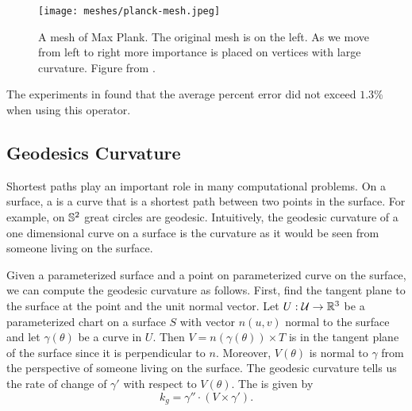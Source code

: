 \begin{figure}[htb]
\centering
\texttt{[image: meshes/planck-mesh.jpeg]}
\caption{A mesh of Max Plank. The original mesh is on the left. As we move
from left to right more importance is placed on vertices with large curvature.
Figure from \cite{alliez-2002}.}
\label{fig:planck-mesh}
\end{figure}


The experiments in \cite{mmsb-2003} found that the average
percent error did not exceed $1.3\%$ when using this operator.



\subsection{Geodesics Curvature}

Shortest paths play an important role in many computational problems.
On a surface, a  is a curve that is a shortest path
between two points in the surface. 
For example, on $\mathbb{S}^2$ great circles are geodesic.
Intuitively, the geodesic curvature of a one dimensional curve on a surface
is the curvature as it would be seen from someone living on the surface.


Given a parameterized surface and a point on parameterized curve on the surface,
we can compute the geodesic curvature as follows.
First, find the tangent plane to the surface at the point and the unit normal vector.
Let $U:\mathcal{U}\to \mathbb{R}^3$ be a parameterized chart on a surface $S$ with vector $n(u,v)$ normal
to the surface
and let $\gamma(\theta)$ be a curve in $U$.
Then $V=n(\gamma(\theta))\times T$ is in the tangent plane of the surface since
it is perpendicular to $n$. Moreover, $V(\theta)$ is normal to $\gamma$ 
from the perspective of someone living on the surface. 
The geodesic curvature tells us the rate of change of $\gamma'$ with respect 
to $V(\theta)$.
The  is given by 
\begin{equation} \label{eqn:geodesic}
	k_g=\gamma'' \cdot (V\times \gamma').
\end{equation}

